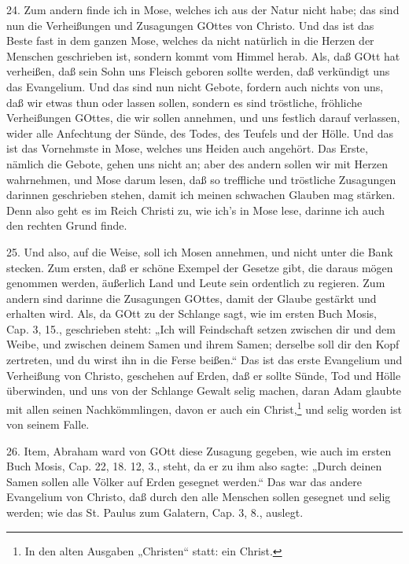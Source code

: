 24. Zum andern finde ich in Mose, welches ich aus der Natur nicht habe; das sind nun die Verheißungen und Zusagungen GOttes von Christo. Und das ist das Beste fast in dem ganzen Mose, welches da nicht natürlich in die Herzen der Menschen geschrieben ist, sondern kommt vom Himmel herab. Als, daß GOtt hat verheißen, daß sein Sohn uns Fleisch geboren sollte werden, daß verkündigt uns das Evangelium. Und das sind nun nicht Gebote, fordern auch nichts von uns, daß wir etwas thun oder lassen sollen, sondern es sind tröstliche, fröhliche Verheißungen GOttes, die wir sollen annehmen, und uns festlich darauf verlassen, wider alle Anfechtung der Sünde, des Todes, des Teufels und der Hölle. Und das ist das Vornehmste in Mose, welches uns Heiden auch angehört. Das Erste, nämlich die Gebote, gehen uns nicht an; aber des andern sollen wir mit Herzen wahrnehmen, und Mose darum lesen, daß so treffliche und tröstliche Zusagungen darinnen geschrieben stehen, damit ich meinen schwachen Glauben mag stärken. Denn also geht es im Reich Christi zu, wie ich’s in Mose lese, darinne ich auch den rechten Grund finde.

25. Und also, auf die Weise, soll ich Mosen annehmen, und nicht unter die Bank stecken. Zum ersten, daß er schöne Exempel der Gesetze gibt, die daraus mögen genommen werden, äußerlich Land und Leute sein ordentlich zu regieren. Zum andern sind darinne die Zusagungen GOttes, damit der Glaube gestärkt und erhalten wird. Als, da GOtt zu der Schlange sagt, wie im ersten Buch Mosis, Cap. 3, 15., geschrieben steht: „Ich will Feindschaft setzen zwischen dir und dem Weibe, und zwischen deinem Samen und ihrem Samen; derselbe soll dir den Kopf zertreten, und du wirst ihn in die Ferse beißen.“ Das ist das erste Evangelium und Verheißung von Christo, geschehen auf Erden, daß er sollte Sünde, Tod und Hölle überwinden, und uns von der Schlange Gewalt selig machen, daran Adam glaubte mit allen seinen Nachkömmlingen, davon er auch ein Christ,\footnote{In den alten Ausgaben „Christen“ statt: ein Christ.} und selig worden ist von seinem Falle.

26. Item, Abraham ward von GOtt diese Zusagung gegeben, wie auch im ersten Buch Mosis, Cap. 22, 18. 12, 3., steht, da er zu ihm also sagte: „Durch deinen Samen sollen alle Völker auf Erden gesegnet werden.“ Das war das andere Evangelium von Christo, daß durch den alle Menschen sollen gesegnet und selig werden; wie das St. Paulus zum Galatern, Cap. 3, 8., auslegt.

